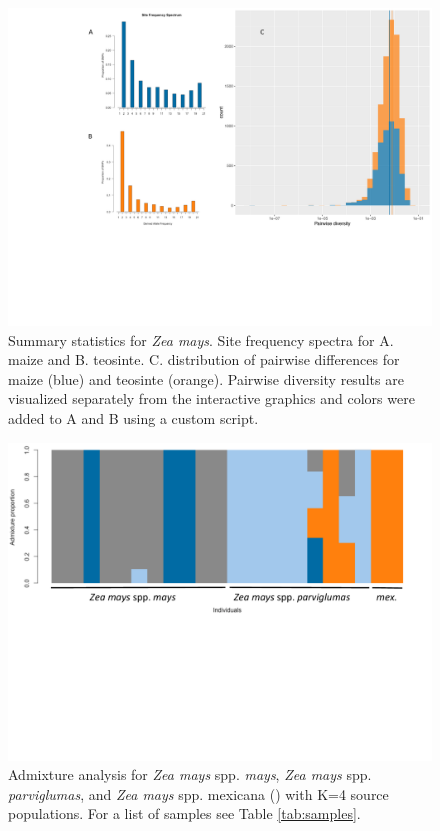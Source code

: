 \documentclass[10pt,a4paper]{article}
\begin{document}
\begin{figure}
\centering
\includegraphics[width=\linewidth]{figures/figure3big.pdf}
\caption{Summary statistics for {\it Zea mays}. Site frequency spectra for A. maize and B. teosinte. C. distribution of pairwise differences for maize (blue) and teosinte (orange). Pairwise diversity results are visualized separately from the interactive graphics and colors were added to A and B using a custom script.}
\label{fig:figure3}
\end{figure}

\begin{figure}
\centering
\includegraphics[width=\linewidth]{figures/mt4labeled.pdf}
\caption{Admixture analysis for {\it Zea mays} spp. {\it mays}, {\it Zea mays} spp. {\it parviglumas}, and {\it Zea mays} spp. {mexicana} () with K=4 source populations. For a list of samples see Table \ref{tab:samples}. }
\label{fig:admixture}
\end{figure}
\end{document}
